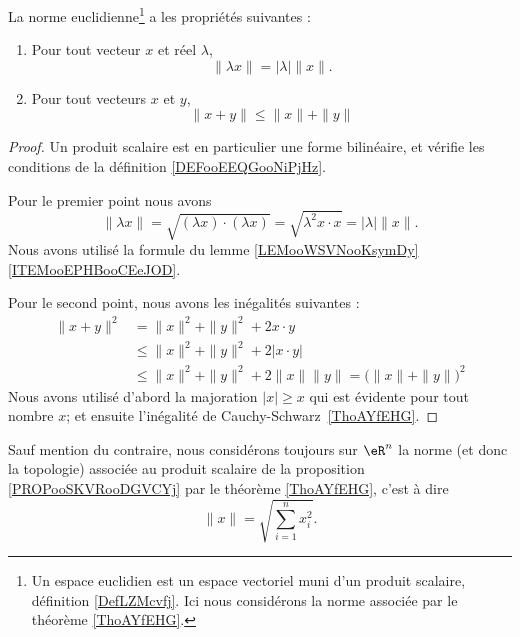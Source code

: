 \begin{proposition}     \label{PROPooVSVMooZrqxdc}
	La norme euclidienne\footnote{Un espace euclidien est un espace vectoriel muni d'un produit scalaire, définition \ref{DefLZMcvfj}. Ici nous considérons la norme associée par le théorème \ref{ThoAYfEHG}.} a les propriétés suivantes :
	\begin{enumerate}
		\item
		      Pour tout vecteur \( x\) et réel \( \lambda\),
		      \begin{equation}
			      \| \lambda x \|=| \lambda |\| x \|.
		      \end{equation}
		\item
		      Pour tout vecteurs \( x\) et \( y\),
		      \begin{equation}
			      \| x+y \|\leq \| x \|+\| y \|
		      \end{equation}
	\end{enumerate}
\end{proposition}

\begin{proof}
	Un produit scalaire est en particulier une forme bilinéaire, et vérifie les conditions de la définition \ref{DEFooEEQGooNiPjHz}.

	Pour le premier point nous avons
	\begin{equation}
		\| \lambda x\|=\sqrt{ (\lambda x)\cdot (\lambda x) }=\sqrt{ \lambda^2 x\cdot x }=| \lambda |\| x \|.
	\end{equation}
	Nous avons utilisé la formule du lemme \ref{LEMooWSVNooKsymDy}\ref{ITEMooEPHBooCEeJOD}.

	Pour le second point, nous avons les inégalités suivantes :
	\begin{subequations}
		\begin{align}
			\| x+y \|^2 & =\| x \|^2+\| y \|^2+2x\cdot y                                         \\
			            & \leq\| x \|^2+\| y \|^2+2|x\cdot y|                                    \\
			            & \leq\| x \|^2+\| y \|^2+2\| x \|\| y \| =\big( \| x \|+\| y \| \big)^2
		\end{align}
	\end{subequations}
	Nous avons utilisé d'abord la majoration \( | x |\geq x\) qui est évidente pour tout nombre \( x\); et ensuite l'inégalité de Cauchy-Schwarz~\ref{ThoAYfEHG}.
\end{proof}

\begin{definition}        \label{DEFooJAGXooMgaUsR}
	Sauf mention du contraire, nous considérons toujours sur \( \eR^n\) la norme (et donc la topologie) associée au produit scalaire de la proposition \ref{PROPooSKVRooDGVCYj} par le théorème \ref{ThoAYfEHG}, c'est à dire
	\begin{equation}
		\| x \|=\sqrt{ \sum_{i=1}^nx_i^2 }.
	\end{equation}
\end{definition}

